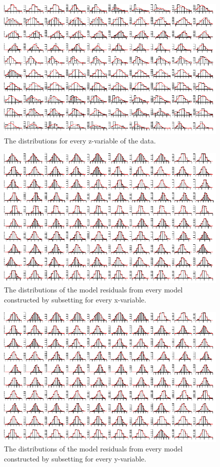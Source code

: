 \documentclass[11pt, fleqn, titlepage]{article}
\begin{document}
\begin{figure}[H]
	\centering
	\includegraphics[width=0.9\linewidth]{billeder/z_dists}
	\caption{The distributions for every z-variable of the data.}
	\label{fig:zdists}
\end{figure}

\begin{figure}[H]
	\centering
	\includegraphics[width=0.9\linewidth]{billeder/residu1}
	\caption{The distributions of the model residuals from every model constructed by subsetting for every x-variable.}
	\label{fig:residu1}
\end{figure}

\begin{figure}[H]
	\centering
	\includegraphics[width=0.9\linewidth]{billeder/residu2}
	\caption{The distributions of the model residuals from every model constructed by subsetting for every y-variable.}
	\label{fig:residu2}
\end{figure}
	
\end{document}
